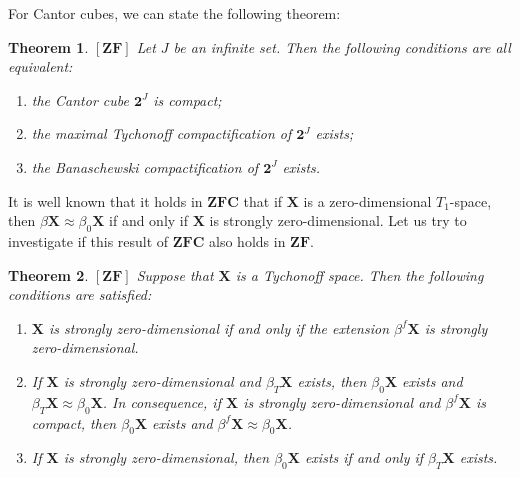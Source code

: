 \documentclass[12pt,twoside,leqno]{article}
\theoremstyle{plain}
\newtheorem{theorem}{Theorem}[section]
\theoremstyle{definition}
\theoremstyle{remark}
\begin{document}
For Cantor cubes, we can state the following theorem:

\begin{theorem}
	\label{s2:t5}
	$[\mathbf{ZF}]$ Let $J$ be an infinite set. Then the following conditions are all equivalent:
	\begin{enumerate}
		\item[(i)] the Cantor cube $\mathbf{2}^J$ is compact;
		\item[(ii)] the maximal Tychonoff compactification of $\mathbf{2}^J$ exists;
		\item[(iii)] the Banaschewski compactification of $\mathbf{2}^J$ exists. 
	\end{enumerate}
\end{theorem}

It is well known that it holds in $\mathbf{ZFC}$ that if $\mathbf{X}$ is a zero-dimensional $T_1$-space,  then $\beta\mathbf{X}\approx\beta_0\mathbf{X}$ if and only if $\mathbf{X}$ is strongly zero-dimensional. Let us try to investigate if this result of $\mathbf{ZFC}$ also holds in $\mathbf{ZF}$.  

\begin{theorem} 
	\label{s2:t6}
	$[\mathbf{ZF}]$ Suppose that $\mathbf{X}$ is a Tychonoff space.  Then the following conditions are satisfied:
	\begin{enumerate}
		\item[(i)] $\mathbf{X}$ is strongly zero-dimensional if and only if the extension $\beta^{f}\mathbf{X}$ is strongly zero-dimensional.
		\item[(ii)] If $\mathbf{X}$ is strongly zero-dimensional and $\beta_{T}\mathbf{X}$ exists, then $\beta_0\mathbf{X}$ exists and $\beta_{T}\mathbf{X}\approx\beta_0\mathbf{X}$. In consequence, if $\mathbf{X}$ is strongly zero-dimensional and $\beta^{f}\mathbf{X}$ is compact, then $\beta_0\mathbf{X}$ exists and  $\beta^{f}\mathbf{X}\approx\beta_0\mathbf{X}$.
		\item[(iii)] If $\mathbf{X}$ is strongly zero-dimensional, then $\beta_0\mathbf{X}$ exists if and only if $\beta_{T}\mathbf{X}$ exists.
	\end{enumerate}
\end{theorem}
\end{document}
